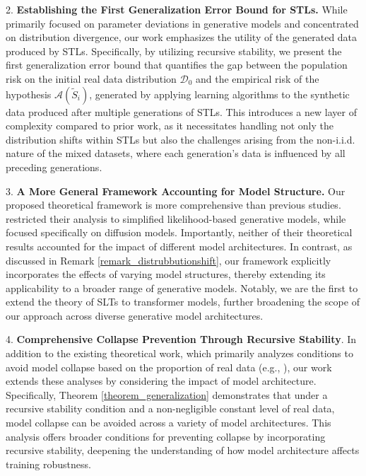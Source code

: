 \begin{remark}
2. \textbf{Establishing the First Generalization Error Bound for STLs.} While \cite{bertrandstability} primarily focused on parameter deviations in generative models and \cite{futowards} concentrated on distribution divergence, our work emphasizes the utility of the generated data produced by STLs. Specifically, by utilizing recursive stability, we present the first generalization error bound that quantifies the gap between the population risk on the initial real data distribution $\mathcal{D}_0$ and the empirical risk of the hypothesis $\mathcal{A}(\widetilde{S}_i)$, generated by applying learning algorithms to the synthetic data produced after multiple generations of STLs. This introduces a new layer of complexity compared to prior work, as it necessitates handling not only the distribution shifts within STLs but also the challenges arising from the non-i.i.d. nature of the mixed datasets, where each generation’s data is influenced by all preceding generations.


3. \textbf{A More General Framework Accounting for Model Structure.} Our proposed theoretical framework is more comprehensive than previous studies. \cite{bertrandstability} restricted their analysis to simplified likelihood-based generative models, while \cite{futowards} focused specifically on diffusion models. Importantly, neither of their theoretical results accounted for the impact of different model architectures. In contrast, as discussed in Remark \ref{remark_distrubbutionshift}, our framework explicitly incorporates the effects of varying model structures, thereby extending its applicability to a broader range of generative models. Notably, we are the first to extend the theory of SLTs to transformer models, further broadening the scope of our approach across diverse generative model architectures.

4. \textbf{Comprehensive Collapse Prevention Through Recursive Stability}. In addition to the existing theoretical work, which primarily analyzes conditions to avoid model collapse based on the proportion of real data (e.g., \cite{bertrandstability,futowards}), our work extends these analyses by considering the impact of model architecture. Specifically, Theorem \ref{theorem_generalization} demonstrates that under a recursive stability condition and a non-negligible constant level of real data, model collapse can be avoided across a variety of model architectures. This analysis offers broader conditions for preventing collapse by incorporating recursive stability, deepening the understanding of how model architecture affects training robustness.

\end{remark}



